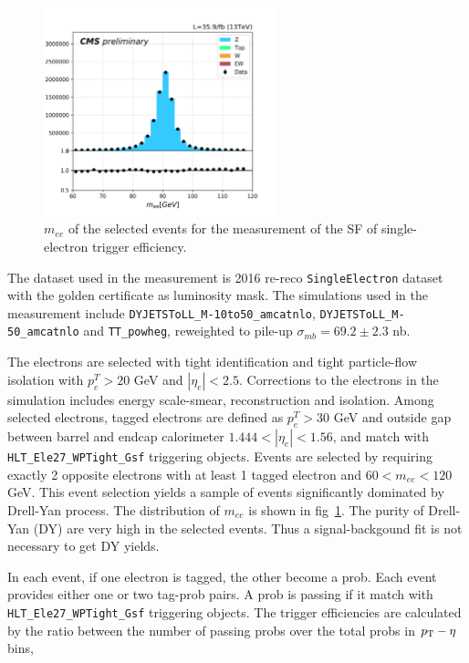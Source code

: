 \begin{figure}
    \centering
    \includegraphics[width=0.6\textwidth]{chapters/Analysis/sectionCalibration/figures/eTrigger/dileptonMass_tag30.png}
    \caption{$m_{ee}$ of the selected events for the measurement of the SF of single-electron trigger efficiency.}
    \label{fig:appendix:ele27TriggerSF}
\end{figure}


The dataset used in the measurement is 2016 re-reco \texttt{SingleElectron} dataset with the golden certificate as luminosity mask. The simulations used in the measurement include \texttt{DYJETSToLL\_M-10to50\_amcatnlo}, \texttt{DYJETSToLL\_M-50\_amcatnlo} and \texttt{TT\_powheg}, reweighted to pile-up $\sigma_{mb} = 69.2\pm 2.3$ nb.

The electrons are selected with tight identification and tight particle-flow isolation with $p^T_e>20$ GeV and $|\eta_e|<2.5$. Corrections to the electrons in the simulation includes energy scale-smear, reconstruction and isolation. Among selected electrons, tagged electrons are defined as $p^T_e>30$ GeV and outside gap between barrel and endcap calorimeter $1.444<|\eta_e|<1.56$, and match with \texttt{HLT\_Ele27\_WPTight\_Gsf} triggering objects. Events are selected by requiring exactly 2 opposite electrons with at least 1 tagged electron and $60<m_{ee}<120$ GeV. This event selection yields a sample of events significantly dominated by Drell-Yan process. The distribution of $m_{ee}$ is shown in fig~\ref{fig:appendix:ele27TriggerSF}. The purity of Drell-Yan (DY) are very high in the selected events. Thus a signal-backgound fit is not necessary to get DY yields.





In each event, if one electron is tagged, the other become a prob. Each event provides either one or two tag-prob pairs. A prob is passing if it match with \texttt{HLT\_Ele27\_WPTight\_Gsf} triggering objects. The trigger efficiencies are calculated by the ratio between the number of passing probs over the total probs in $p_{\mathrm{T}}-\eta$ bins, 

